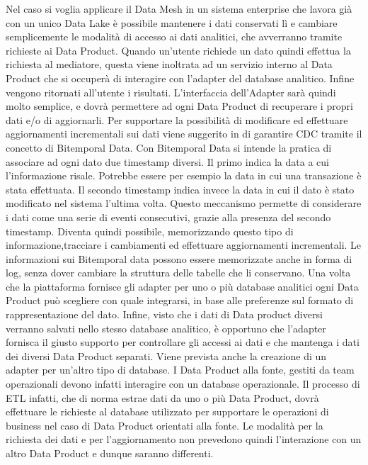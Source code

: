 \documentclass[12pt]{report}
\begin{document}
Nel caso si voglia applicare il Data Mesh in un sistema enterprise che lavora già con un unico Data Lake è possibile mantenere i dati conservati lì e cambiare semplicemente le modalità di accesso ai dati analitici, che avverranno tramite richieste ai Data Product.
Quando un'utente richiede un dato quindi effettua la richiesta al mediatore, questa viene inoltrata ad un servizio interno al Data Product che si occuperà di interagire con l'adapter del database analitico. 
Infine vengono ritornati all'utente i risultati.
L'interfaccia dell'Adapter sarà quindi molto semplice, e dovrà permettere ad ogni Data Product di recuperare i propri dati e/o di aggiornarli.
Per supportare la possibilità di modificare ed effettuare aggiornamenti incrementali sui dati viene suggerito in \cite{zhamak_dehgani_data_2023,fowlerBitemporalNodate}
di garantire CDC tramite il concetto di Bitemporal Data.
Con Bitemporal Data si intende la pratica di associare ad ogni dato due timestamp diversi. 
Il primo indica la data a cui l'informazione risale. 
Potrebbe essere per esempio la data in cui una transazione è stata effettuata.
Il secondo timestamp indica invece la data in cui il dato è stato modificato nel sistema l'ultima volta.
Questo meccanismo permette di considerare i dati come una serie di eventi consecutivi, grazie alla presenza del secondo timestamp.
Diventa quindi possibile, memorizzando questo tipo di informazione,tracciare i cambiamenti ed effettuare aggiornamenti incrementali.
Le informazioni sui Bitemporal data possono essere memorizzate anche in forma di log, senza dover cambiare la struttura delle tabelle che li conservano.
Una volta che la piattaforma fornisce gli adapter per uno o più database analitici ogni Data Product può scegliere con quale integrarsi, in base alle preferenze sul formato di rappresentazione del dato.
Infine, visto che i dati di Data product diversi verranno salvati nello stesso database analitico, è opportuno che l'adapter fornisca il giusto supporto per controllare gli accessi ai dati e che mantenga i dati dei diversi Data Product separati.
Viene prevista anche la creazione di un adapter per un'altro tipo di database.
I Data Product alla fonte, gestiti da team operazionali devono infatti interagire con un database operazionale.
Il processo di ETL infatti, che di norma estrae dati da uno o più Data Product, dovrà effettuare le richieste al database  utilizzato per supportare le operazioni di business nel caso di Data Product orientati alla fonte.
Le modalità per la richiesta dei dati e per l'aggiornamento non prevedono quindi l'interazione con un altro Data Product e dunque saranno differenti.
\end{document}
